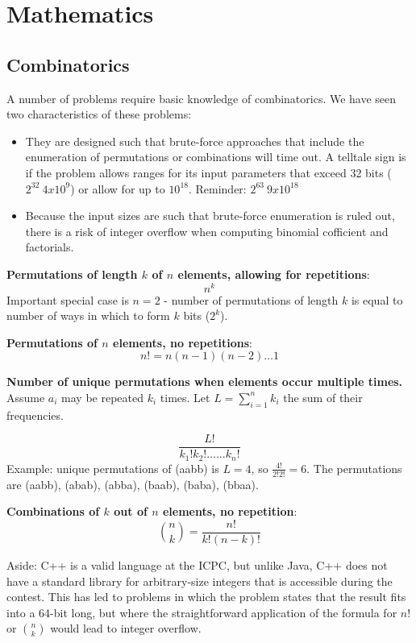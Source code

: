 \chapter{Mathematics}

\section{Combinatorics}

A number of problems require basic knowledge of combinatorics.  
We have seen two characteristics of these problems:
\begin{itemize}
\item They are designed such that brute-force approaches that include the enumeration of
    permutations or combinations will time out.  A telltale sign is if the problem allows
    ranges for its input parameters that exceed 32 bits ($2^{32} ~ 4 x 10^9$) or allow
    for up to $10^{18}$.  Reminder: $2^{63} ~ 9 x 10^{18}$
\item Because the input sizes are such that brute-force enumeration is ruled out, there
    is a risk of integer overflow when computing binomial cofficient and factorials.
\end{itemize}

\textbf{Permutations of length $k$ of $n$ elements, allowing for repetitions}: 
\[
    n^k
\]
Important special case is $n=2$ - number of permutations
of length $k$ is equal to number of ways in which to form $k$ bits ($2^k$).

\textbf{Permutations of $n$ elements, no repetitions}: 
\[
    n! = n (n-1) (n-2) \ldots 1
\]


\textbf{Number of unique permutations when elements occur multiple times.}  Assume $a_i$ may be repeated $k_i$ times. 
    Let $L = \sum_{i = 1}^{n} k_i$ the sum of their frequencies.

\[
    \frac{L!}{k_1! k_2! \ldots ... k_n!}
\]
Example: unique permutations of (aabb) is $L = 4$, so $\frac{4!}{2! 2!} = 6$.  The permutations are
(aabb), (abab), (abba), (baab), (baba), (bbaa).

\textbf{Combinations of $k$ out of $n$ elements, no repetition}:
\[
    \binom{n}{k} = \frac{n!}{k! (n-k)!}
\]

Aside: C++ is a valid language at the ICPC, but unlike Java, C++ does not have a standard
library for arbitrary-size integers that is accessible during the contest.  This has led to problems in which
the problem states that the result fits into a 64-bit long, but where the straightforward
application of the formula for $n!$ or $\binom{n}{k}$ would lead to integer overflow.

